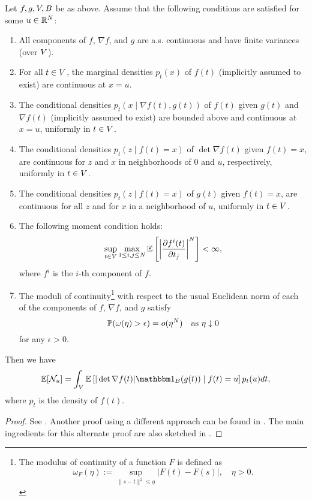 \begin{theorem}
	\label{thm: general kac-rice}
	Let \(f,g,V, B\) be as above. Assume that the following conditions are
	satisfied for some \(u\in\mathbb{R}^N\):	
	\begin{enumerate}[label={(\alph*)}]
		\item All components of \(f\), \(\nabla f\), and \(g\) are a.s. continuous
		and have finite variances (over \(V\)).
		\item For all \(t\in V\), the marginal densities \(p_t(x)\) of \(f(t)\)
		(implicitly assumed to exist) are continuous at \(x=u\).
		\item The conditional densities \(p_t(x\mid\nabla f(t), g(t))\) of \(f(t)\)
		given \(g(t)\) and \(\nabla f(t)\) (implicitly assumed to exist) are
		bounded above and continuous at \(x=u\), uniformly in \(t\in V\).
		\item The conditional densities \(p_t(z\mid f(t) = x)\) of \(\det \nabla f(t)\)
		given \(f(t)=x\), are continuous for \(z\) and \(x\) in neighborhoods of \(0\)
		and \(u\), respectively, uniformly in \(t\in V\).
		\item The conditional densities \(p_t(z\mid f(t) = x)\) of \(g(t)\)
		given \(f(t) = x\), are continuous for all \(z\) and for \(x\) in a
		neighborhood of \(u\), uniformly in \(t\in V\).
		\item The following moment condition holds:
		\[
			\sup_{t\in V}\max_{1\le i,j\le N} \mathbb{E}\left[
				\left|\frac{\partial f^i(t)}{\partial t_j}\right|^N
			\right] < \infty,
		\]
		where \(f^i\) is the \(i\)-th component of \(f\).
		\item The moduli of continuity\footnote{
			The modulus of continuity of a function \(F\) is defined as
			\[
				\omega_F(\eta):= \sup_{\|s-t\|^2\le \eta}|F(t)-F(s)|, \quad \eta>0.
			\]
		} with respect to the
		usual Euclidean norm of each of the components of \(f\), \(\nabla f\), and
		\(g\) satisfy
		\[
			\mathbb{P}(\omega(\eta) > \epsilon) = o(\eta^N) \quad\text{as }\eta\downarrow 0
		\]
		for any \(\epsilon>0\).
	\end{enumerate}
	Then we have
	\begin{equation}
		\E[\level] = \int_\Vol \E\left[
			|\det \nabla f(t)| \ind_B(g(t)) \mid f(t) = u
		\right] p_t(u)dt,
	\end{equation}
	where \(p_t\) is the density of \(f(t)\).	
\end{theorem}
\begin{proof}
	See \textcite[Section~11.2]{adlerRandomFieldsGeometry2007}. Another proof
	using a different approach can be found in
	\textcite[Theorem~6.4]{azaisLevelSetsExtrema2009}. The main ingredients for
	this alternate proof are also sketched in
	\textcite[Section~11.4]{adlerRandomFieldsGeometry2007}.
\end{proof}

